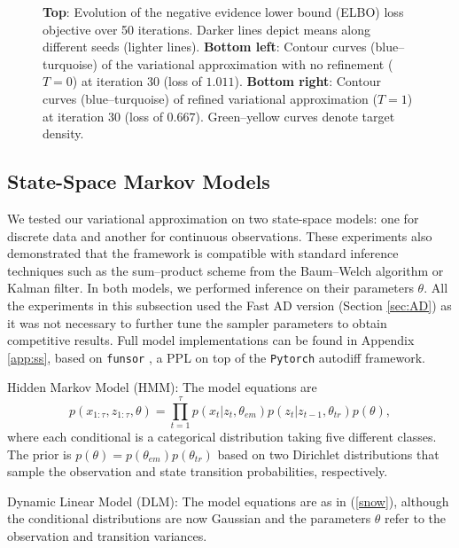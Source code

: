 \begin{figure}[ht]
\begin{center}
\endminipage
\end{center}
\caption{{\textbf{Top}: Evolution of the negative evidence lower bound (ELBO) loss objective over  50 iterations. Darker lines depict means along different seeds (lighter lines). \textbf{Bottom left}: Contour curves (blue--turquoise) of the variational approximation with no refinement ($T=0$) at iteration 30 (loss of $1.011$). \textbf{Bottom right}: Contour curves (blue--turquoise) of  refined variational approximation ($T=1$) at iteration 30 (loss of $0.667$). Green--yellow curves denote target density.}} \label{fig:funnel}
\end{figure}


\subsection{State-Space  Markov Models}

We tested our variational approximation on two state-space models: one for discrete data and another for continuous observations. These experiments also demonstrated that the framework is compatible with standard inference techniques such as the sum--product scheme from the Baum--Welch algorithm or Kalman filter.
In both models, we performed inference on their 
parameters $\theta$.
All the experiments in this subsection used the Fast AD version (Section \ref{sec:AD}) as it was not necessary to further tune the sampler parameters to obtain competitive results. Full model implementations can be found in Appendix \ref{app:ss}, based on \texttt{funsor} \cite{obermeyer2019functional}, a PPL on top of the \texttt{Pytorch} autodiff framework.



Hidden Markov Model (HMM): The model equations are
\begin{equation}\label{snow}
p(x_{1:\tau} , z_{1:\tau}, \theta) = \prod_{t=1}^\tau p(x_t|z_t,\theta_{em})p(z_t|z_{t-1},\theta_{tr})p(\theta),
\end{equation}
where each conditional is a categorical distribution taking 
five different classes.  The prior is $p(\theta) = p(\theta_{em})p(\theta_{tr})$ based on two Dirichlet distributions that sample the observation and state transition probabilities, respectively. 

Dynamic Linear Model (DLM): The model
equations are as in (\ref{snow}), %
although the conditional distributions are now Gaussian and the parameters $\theta$ refer to the observation and transition variances. 

